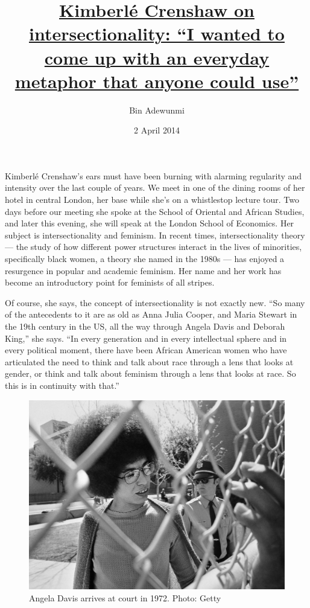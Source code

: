 \documentclass{article}
\title{\href{http://www.newstatesman.com/lifestyle/2014/04/kimberl-crenshaw-intersectionality-i-wanted-come-everyday-metaphor-anyone-could}{Kimberl\'{e} Crenshaw on intersectionality: ``I wanted to come up with an everyday metaphor that anyone could use''}}
\author{Bin Adewunmi}
\date{2 April 2014}
\begin{document}
\maketitle

Kimberl\'{e} Crenshaw's ears must have been burning with alarming regularity
and intensity over the last couple of years. We meet in one of the dining rooms
of her hotel in central London, her base while she's on a whistlestop lecture
tour. Two days before our meeting she spoke at the School of Oriental and
African Studies, and later this evening, she will speak at the London School of
Economics. Her subject is intersectionality and feminism. In recent times,
intersectionality theory --- the study of how different power structures
interact in the lives of minorities, specifically black women, a theory she
named in the 1980s --- has enjoyed a resurgence in popular and academic
feminism. Her name and her work has become an introductory point for feminists
of all stripes.

Of course, she says, the concept of intersectionality is not exactly new. ``So
many of the antecedents to it are as old as Anna Julia Cooper, and Maria
Stewart in the 19th century in the US, all the way through Angela Davis and
Deborah King,'' she says. ``In every generation and in every intellectual
sphere and in every political moment, there have been African American women
who have articulated the need to think and talk about race through a lens that
looks at gender, or think and talk about feminism through a lens that looks at
race. So this is in continuity with that.''

\begin{figure}[h]
	\includegraphics{.resources/Getty72.jpg}
	\caption{Angela Davis arrives at court in 1972. Photo: Getty}
\end{figure}
\end{document}
